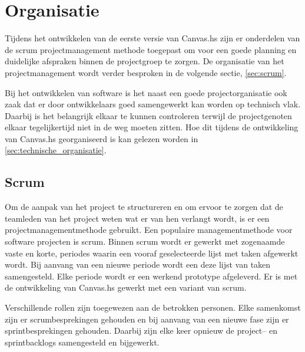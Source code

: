 \chapter{Organisatie} \label{hoofdstuk:organisatie}
Tijdens het ontwikkelen van de eerste versie van Canvas.hs zijn er onderdelen van de scrum projectmanagement methode toegepast om voor een goede planning en duidelijke afspraken binnen de projectgroep te zorgen. De organisatie van het projectmanagement wordt verder besproken in de volgende sectie, \autoref{sec:scrum}.

Bij het ontwikkelen van software is het naast een goede projectorganisatie ook zaak dat er door ontwikkelaars goed samengewerkt kan worden op technisch vlak. Daarbij is het belangrijk elkaar te kunnen controleren terwijl de projectgenoten elkaar tegelijkertijd niet in de weg moeten zitten. Hoe dit tijdens de ontwikkeling van Canvas.hs georganiseerd is kan gelezen worden in \autoref{sec:technische_organisatie}.

\section{Scrum} \label{sec:scrum}
Om de aanpak van het project te structureren en om ervoor te zorgen dat de teamleden van het project weten wat er van hen verlangt wordt, is er een projectmanagementmethode gebruikt. Een populaire managementmethode voor software projecten is scrum. Binnen scrum wordt er gewerkt met zogenaamde vaste en korte, periodes waarin een vooraf geselecteerde lijst met taken afgewerkt wordt. Bij aanvang van een nieuwe periode wordt een deze lijst van taken samengesteld. Elke periode wordt er een werkend prototype afgeleverd. Er is met de ontwikkeling van Canvas.hs gewerkt met een variant van scrum.

Verschillende rollen zijn toegewezen aan de betrokken personen. Elke samenkomst zijn er scrumbesprekingen gehouden en bij aanvang van een nieuwe fase zijn er sprintbesprekingen gehouden. Daarbij zijn elke keer opnieuw de project– en sprintbacklogs samengesteld en bijgewerkt.

